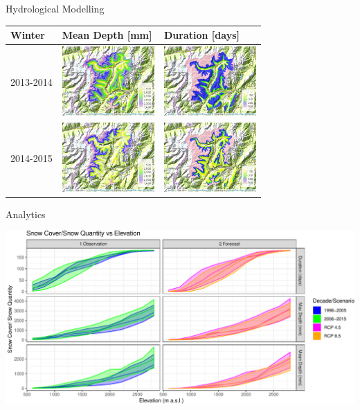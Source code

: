 \documentclass[
  ignorenonframetext,
]{beamer}
\begin{document}
\begin{frame}{Hydrological Modelling}
\protect\hypertarget{hydrological-modelling-1}{}
\begin{longtable}[]{@{}lll@{}}
\toprule
Winter & Mean Depth {[}mm{]} & Duration {[}days{]}\tabularnewline
\midrule
\endhead
2013-2014 &
\includegraphics[width=\textwidth,height=1.04167in]{resources/images/map/mean_OBS_2014_winter.png}
&
\includegraphics[width=\textwidth,height=1.04167in]{resources/images/map/nday_OBS_2014_winter.png}\tabularnewline
2014-2015 &
\includegraphics[width=\textwidth,height=1.04167in]{resources/images/map/mean_OBS_2015_winter.png}
&
\includegraphics[width=\textwidth,height=1.04167in]{resources/images/map/nday_OBS_2015_winter.png}\tabularnewline
\bottomrule
\end{longtable}
\end{frame}

\begin{frame}{Analytics}
\protect\hypertarget{analytics}{}
\begin{center}\includegraphics[width=0.9\linewidth]{introduction_presentation_files/figure-beamer/snow-altitude-1} \end{center}
\end{frame}
\end{document}
